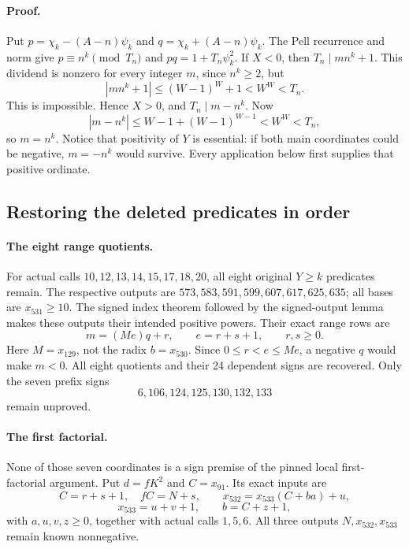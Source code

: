\paragraph{Proof.}
Put $p=\chi_k-(A-n)\psi_k$ and
$q=\chi_k+(A-n)\psi_k$.  The Pell recurrence and norm give
$p\equiv n^k\pmod{T_n}$ and $pq=1+T_n\psi_k^2$.
If $X<0$, then $T_n\mid mn^k+1$.  This dividend is nonzero
for every integer $m$, since $n^k\ge2$, but
\[
 |mn^k+1|\le(W-1)^W+1<W^W<T_n.
\]
This is impossible.  Hence $X>0$, and $T_n\mid m-n^k$.  Now
\[
 |m-n^k|\le W-1+(W-1)^{W-1}<W^W<T_n,
\]
so $m=n^k$.  Notice that positivity of $Y$ is essential:
if both main coordinates could be negative, $m=-n^k$ would survive.
Every application below first supplies that positive ordinate.

\subsection{Restoring the deleted predicates in order}

\paragraph{The eight range quotients.}
For actual calls $10,12,13,14,15,17,18,20$, all eight original
$Y\ge k$ predicates remain.  The respective outputs are
$573,583,591,599,607,617,625,635$; all bases are $x_{531}\ge10$.
The signed index theorem followed by the signed-output lemma makes
these outputs their intended positive powers.  Their exact range
rows are
\[
 m=(Me)q+r,\qquad e=r+s+1,\qquad r,s\ge0.
\]
Here $M=x_{129}$, not the radix $b=x_{530}$.  Since
$0\le r<e\le Me$, a negative $q$ would make $m<0$.
All eight quotients and their 24 dependent signs are recovered.
Only the seven prefix signs
\[
 6,106,124,125,130,132,133
\]
remain unproved.

\paragraph{The first factorial.}
None of those seven coordinates is a sign premise of the pinned
local first-factorial argument.  Put $d=fK^2$ and $C=x_{91}$.
Its exact inputs are
\[
 C=r+s+1,\quad fC=N+s,\qquad
 x_{532}=x_{533}(C+ba)+u,
\]
\[
 x_{533}=u+v+1,\qquad b=C+z+1,
\]
with $a,u,v,z\ge0$, together with actual calls $1,5,6$.
All three outputs $N,x_{532},x_{533}$ remain known nonnegative.

